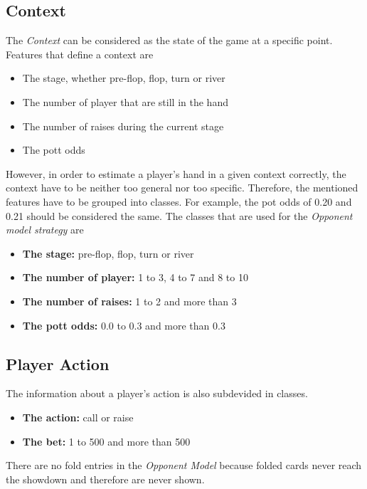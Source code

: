 \subsection{Context}
The \emph{Context} can be considered as the state of the game at a specific point. Features that define a context are 
\begin{itemize}
	\item The stage, whether pre-flop, flop, turn or river
	\item The number of player that are still in the hand
	\item The number of raises during the current stage
	\item The pott odds
\end{itemize}

However, in order to estimate a player's hand in a given context correctly, the context have to be neither too general nor too specific. Therefore, the mentioned features have to be grouped into classes. For example, the pot odds of 0.20 and 0.21 should be considered the same. The classes that are used for the \emph{Opponent model strategy} are 
\begin{itemize}
	\item \textbf{The stage:} pre-flop, flop, turn or river
	\item \textbf{The number of player:} 1 to 3, 4 to 7 and 8 to 10
	\item \textbf{The number of raises:} 1 to 2 and more than 3
	\item \textbf{The pott odds:} 0.0 to 0.3 and more than 0.3
\end{itemize}

\subsection{Player Action}
The information about a player's action is also subdevided in classes.
\begin{itemize}
	\item \textbf{The action:}  call or raise
	\item \textbf{The bet:} 1 to 500 and more than 500
\end{itemize}
There are no fold entries in the \emph{Opponent Model} because folded cards never reach the showdown and therefore are never shown. 

